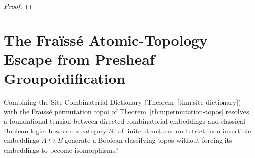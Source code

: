 \begin{proof}
\end{proof}

\section{The Fraïssé Atomic-Topology Escape from Presheaf Groupoidification}\label{subsec:fraisse-atomic-escape}

Combining the Site-Combinatorial Dictionary (Theorem~\ref{thm:site-dictionary}) with the Fraïssé permutation topoi of Theorem~\ref{thm:permutation-topos} resolves a foundational tension between directed combinatorial embeddings and classical Boolean logic: how can a category $\mathcal{K}$ of finite structures and strict, non-invertible embeddings $A \hookrightarrow B$ generate a Boolean classifying topos without forcing its embeddings to become isomorphisms?

